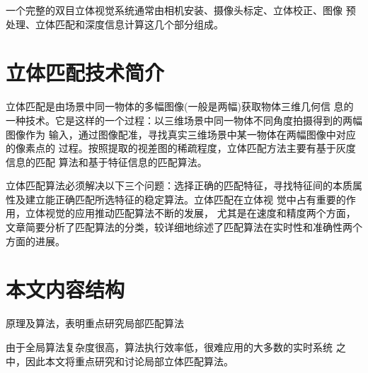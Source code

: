 一个完整的双目立体视觉系统通常由相机安装、摄像头标定、立体校正、图像
预处理、立体匹配和深度信息计算这几个部分组成。

\section{立体匹配技术简介}

立体匹配是由场景中同一物体的多幅图像(一般是两幅)获取物体三维几何信
息的一种技术。它是这样的一个过程：以三维场景中同一物体不同角度拍摄得到的两幅图像作为
输入，通过图像配准，寻找真实三维场景中某一物体在两幅图像中对应的像素点的
过程。按照提取的视差图的稀疏程度，立体匹配方法主要有基于灰度信息的匹配
算法和基于特征信息的匹配算法。

立体匹配算法必须解决以下三个问题：选择正确的匹配特征，寻找特征间的本质属性及建立能正确匹配所选特征的稳定算法。立体匹配在立体视 觉中占有重要的作用，立体视觉的应用推动匹配算法不断的发展， 尤其是在速度和精度两个方面，文章简要分析了匹配算法的分类，较详细地综述了匹配算法在实时性和准确性两个方面的进展。

\section{本文内容结构}

原理及算法，表明重点研究局部匹配算法

由于全局算法复杂度很高，算法执行效率低，很难应用的大多数的实时系统
之中，因此本文将重点研究和讨论局部立体匹配算法。

